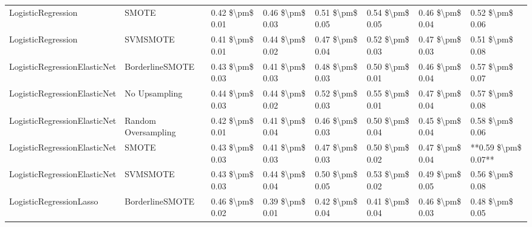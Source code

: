 \begin{tabular}{llllllll}
             LogisticRegression &                         SMOTE & 0.42 \$\textbackslash pm\$ 0.01 &           0.46 \$\textbackslash pm\$ 0.03 &       0.51 \$\textbackslash pm\$ 0.05 &        0.54 \$\textbackslash pm\$ 0.05 &                         0.46 \$\textbackslash pm\$ 0.04 &     0.52 \$\textbackslash pm\$ 0.06 \\
             LogisticRegression &                      SVMSMOTE & 0.41 \$\textbackslash pm\$ 0.01 &           0.44 \$\textbackslash pm\$ 0.02 &       0.47 \$\textbackslash pm\$ 0.04 &        0.52 \$\textbackslash pm\$ 0.03 &                         0.47 \$\textbackslash pm\$ 0.03 &     0.51 \$\textbackslash pm\$ 0.08 \\
   LogisticRegressionElasticNet &               BorderlineSMOTE & 0.43 \$\textbackslash pm\$ 0.03 &           0.41 \$\textbackslash pm\$ 0.03 &       0.48 \$\textbackslash pm\$ 0.03 &        0.50 \$\textbackslash pm\$ 0.01 &                         0.46 \$\textbackslash pm\$ 0.04 &     0.57 \$\textbackslash pm\$ 0.07 \\
   LogisticRegressionElasticNet &                 No Upsampling & 0.44 \$\textbackslash pm\$ 0.03 &           0.44 \$\textbackslash pm\$ 0.02 &       0.52 \$\textbackslash pm\$ 0.03 &        0.55 \$\textbackslash pm\$ 0.01 &                         0.47 \$\textbackslash pm\$ 0.04 &     0.57 \$\textbackslash pm\$ 0.08 \\
   LogisticRegressionElasticNet &           Random Oversampling & 0.42 \$\textbackslash pm\$ 0.01 &           0.41 \$\textbackslash pm\$ 0.04 &       0.46 \$\textbackslash pm\$ 0.03 &        0.50 \$\textbackslash pm\$ 0.04 &                         0.45 \$\textbackslash pm\$ 0.04 &     0.58 \$\textbackslash pm\$ 0.06 \\
   LogisticRegressionElasticNet &                         SMOTE & 0.43 \$\textbackslash pm\$ 0.03 &           0.41 \$\textbackslash pm\$ 0.03 &       0.47 \$\textbackslash pm\$ 0.03 &        0.50 \$\textbackslash pm\$ 0.02 &                         0.47 \$\textbackslash pm\$ 0.04 & **0.59 \$\textbackslash pm\$ 0.07** \\
   LogisticRegressionElasticNet &                      SVMSMOTE & 0.43 \$\textbackslash pm\$ 0.03 &           0.44 \$\textbackslash pm\$ 0.04 &       0.50 \$\textbackslash pm\$ 0.05 &        0.53 \$\textbackslash pm\$ 0.02 &                         0.49 \$\textbackslash pm\$ 0.05 &     0.56 \$\textbackslash pm\$ 0.08 \\
        LogisticRegressionLasso &               BorderlineSMOTE & 0.46 \$\textbackslash pm\$ 0.02 &           0.39 \$\textbackslash pm\$ 0.01 &       0.42 \$\textbackslash pm\$ 0.04 &        0.41 \$\textbackslash pm\$ 0.04 &                         0.46 \$\textbackslash pm\$ 0.03 &     0.48 \$\textbackslash pm\$ 0.05 \\

\end{tabular}
